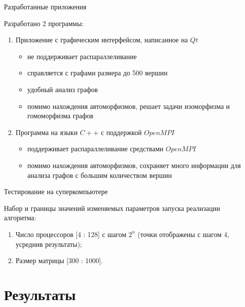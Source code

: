 \documentclass{beamer}
\begin{document}
\begin{frame}{Разработанные приложения}

Разработано 2 программы:

\begin{enumerate}
\item Приложение с графическим интерфейсом, написанное на $Qt$
\begin{itemize}
\item не поддерживает распараллеливание
\item справляется с графами размера до 500 вершин
\item удобный анализ графов
\item помимо нахождения автоморфизмов, решает задачи изоморфизма и гомоморфизма графов
\end{itemize} 
\item Программа на языки $C++$ с поддержкой $OpenMPI$
\begin{itemize}
\item поддерживает распараллеливание средствами $OpenMPI$
\item помимо нахождения автоморфизмов, сохраняет много информации для анализа графов с большим количеством вершин
\end{itemize} 
\end{enumerate} 

\end{frame}

\begin{frame}{Тестирование на суперкомпьютере}

Набор и границы значений изменяемых параметров запуска реализации алгоритма: 

\begin{enumerate}
\item Число процессоров [4 : 128] с шагом $ 2^n$ (точки отображены с шагом 4, усреднив результаты);
\item Размер матрицы [300 : 1000].
\end{enumerate}

\end{frame}




\section{Результаты} 
\end{document}
